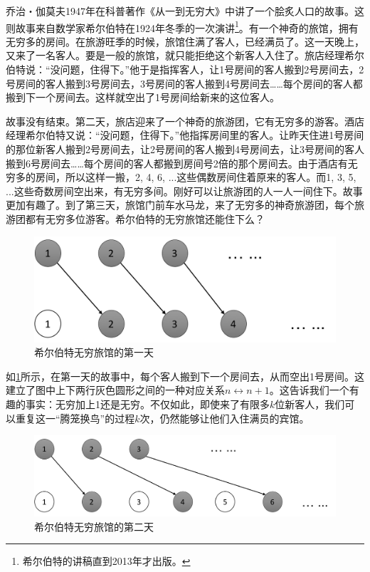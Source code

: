 \documentclass[b5paper]{ctexart}
\begin{document}
乔治・伽莫夫1947年在科普著作《从一到无穷大》中讲了一个脍炙人口的故事。这则故事来自数学家希尔伯特在1924年冬季的一次演讲\footnote{希尔伯特的讲稿直到2013年才出版。}。有一个神奇的旅馆，拥有无穷多的房间。在旅游旺季的时候，旅馆住满了客人，已经满员了。这一天晚上，又来了一名客人。要是一般的旅馆，就只能拒绝这个新客人入住了。旅店经理希尔伯特说：“没问题，住得下。”他于是指挥客人，让1号房间的客人搬到2号房间去，2号房间的客人搬到3号房间去，3号房间的客人搬到4号房间去……每个房间的客人都搬到下一个房间去。这样就空出了1号房间给新来的这位客人。

故事没有结束。第二天，旅店迎来了一个神奇的旅游团，它有无穷多的游客。酒店经理希尔伯特又说：“没问题，住得下。”他指挥房间里的客人。让昨天住进1号房间的那位新客人搬到2号房间去，让2号房间的客人搬到4号房间去，让3号房间的客人搬到6号房间去……每个房间的客人都搬到房间号2倍的那个房间去。由于酒店有无穷多的房间，所以这样一搬，2, 4, 6, ...这些偶数房间住着原来的客人。而1, 3, 5, ...这些奇数房间空出来，有无穷多间。刚好可以让旅游团的人一人一间住下。故事更加有趣了。到了第三天，旅馆门前车水马龙，来了无穷多的神奇旅游团，每个旅游团都有无穷多位游客。希尔伯特的无穷旅馆还能住下么？

\begin{figure}[htbp]
 \centering
 \includegraphics[scale=0.4]{img/Hilbert-hotel-1}
 \caption{希尔伯特无穷旅馆的第一天}
 \label{fig:Hilbert-hotel-1}
\end{figure}

如\cref{fig:Hilbert-hotel-1}所示，在第一天的故事中，每个客人搬到下一个房间去，从而空出1号房间。这建立了图中上下两行灰色圆形之间的一种对应关系$n \leftrightarrow n+1$。这告诉我们一个有趣的事实：无穷加上1还是无穷。不仅如此，即使来了有限多$k$位新客人，我们可以重复这一“腾笼换鸟”的过程$k$次，仍然能够让他们入住满员的宾馆。

\begin{figure}[htbp]
 \centering
 \includegraphics[scale=0.4]{img/Hilbert-hotel-2}
 \caption{希尔伯特无穷旅馆的第二天}
 \label{fig:Hilbert-hotel-2}
\end{figure}
\end{document}
